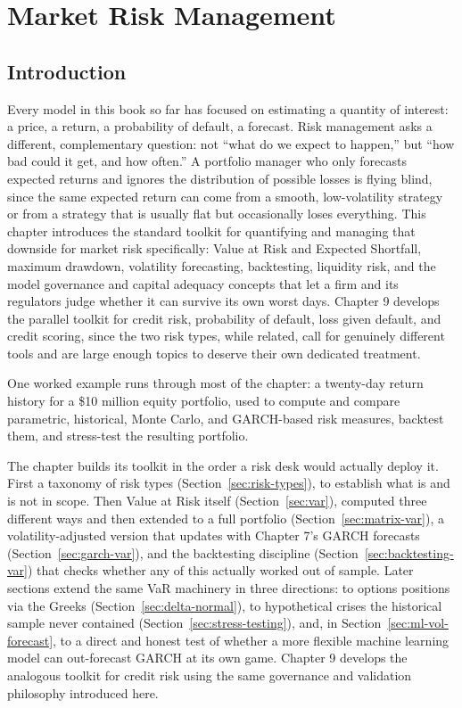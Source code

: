 \documentclass[../ai_in_finance]{subfiles}
\begin{document}
\chapter{Market Risk Management}

\section{Introduction}

Every model in this book so far has focused on estimating a quantity of interest: a price, a return, a probability of default, a forecast. Risk management asks a different, complementary question: not ``what do we expect to happen,'' but ``how bad could it get, and how often.'' A portfolio manager who only forecasts expected returns and ignores the distribution of possible losses is flying blind, since the same expected return can come from a smooth, low-volatility strategy or from a strategy that is usually flat but occasionally loses everything.
This chapter introduces the standard toolkit for quantifying and managing that downside for market risk specifically: Value at Risk and Expected Shortfall, maximum drawdown, volatility forecasting, backtesting, liquidity risk, and the model governance and capital adequacy concepts that let a firm and its regulators judge whether it can survive its own worst days.
Chapter 9 develops the parallel toolkit for credit risk, probability of default, loss given default, and credit scoring, since the two risk types, while related, call for genuinely different tools and are large enough topics to deserve their own dedicated treatment.

One worked example runs through most of the chapter: a twenty-day return history for a \$10 million equity portfolio, used to compute and compare parametric, historical, Monte Carlo, and GARCH-based risk measures, backtest them, and stress-test the resulting portfolio.

The chapter builds its toolkit in the order a risk desk would actually deploy it. First a taxonomy of risk types (Section~\ref{sec:risk-types}), to establish what is and is not in scope. Then Value at Risk itself (Section~\ref{sec:var}), computed three different ways and then extended to a full portfolio (Section~\ref{sec:matrix-var}), a volatility-adjusted version that updates with Chapter 7's GARCH forecasts (Section~\ref{sec:garch-var}), and the backtesting discipline (Section~\ref{sec:backtesting-var}) that checks whether any of this actually worked out of sample.
Later sections extend the same VaR machinery in three directions: to options positions via the Greeks (Section~\ref{sec:delta-normal}), to hypothetical crises the historical sample never contained (Section~\ref{sec:stress-testing}), and, in Section~\ref{sec:ml-vol-forecast}, to a direct and honest test of whether a more flexible machine learning model can out-forecast GARCH at its own game. Chapter 9 develops the analogous toolkit for credit risk using the same governance and validation philosophy introduced here.
\end{document}
